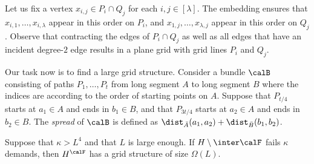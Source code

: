 Let us fix a vertex $x_{i,j}\in P_i\cap Q_j$ for each $i,j\in [\lambda]$. The embedding ensures that $x_{i,1},\dots,x_{i,\lambda}$ appear in this order on $P_i$, and $x_{1,j},\dots,x_{\lambda,j}$ appear in this order on $Q_j$. Observe that contracting the edges of $P_i\cap Q_j$ as well as all edges that have an incident degree-$2$ edge results in a plane grid with grid lines $P_i$ and $Q_j$.

Our task now is to find a large grid structure. Consider a bundle $\calB$ consisting of paths $P_1,\dots,P_t$ from long segment $A$ to long segment $B$ where the indices are according to the order of starting points on $A$. Suppose that $P_{t/4}$ starts at $a_1\in A$ and ends in $b_1\in B$, and that $P_{3t/4}$ starts at $a_2\in A$ and ends in $b_2\in B$. The \emph{spread} of $\calB$ is defined as $\dist_{\bar A}(a_1,a_2)+\dist_{\bar B}(b_1,b_2)$.

\begin{lemma}\label{lem:findgrid}
Suppose that $\kappa>L^4$ and that $L$ is large enough. If $H\setminus \inter \calF$ fails $\kappa$ demands, then $H^\calF$ has a grid structure of size $\Omega(L)$.
\end{lemma}


